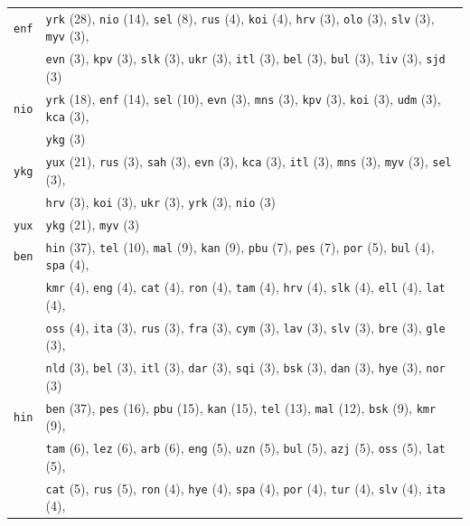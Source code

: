 \begin{center}
\begin{longtable}{ll}
\texttt{enf} & \texttt{yrk} (28), \texttt{nio} (14), \texttt{sel} (8), \texttt{rus} (4), \texttt{koi} (4), \texttt{hrv} (3), \texttt{olo} (3), \texttt{slv} (3), \texttt{myv} (3), \\
 & \texttt{evn} (3), \texttt{kpv} (3), \texttt{slk} (3), \texttt{ukr} (3), \texttt{itl} (3), \texttt{bel} (3), \texttt{bul} (3), \texttt{liv} (3), \texttt{sjd} (3) \\
\texttt{nio} & \texttt{yrk} (18), \texttt{enf} (14), \texttt{sel} (10), \texttt{evn} (3), \texttt{mns} (3), \texttt{kpv} (3), \texttt{koi} (3), \texttt{udm} (3), \texttt{kca} (3), \\
 & \texttt{ykg} (3) \\
\texttt{ykg} & \texttt{yux} (21), \texttt{rus} (3), \texttt{sah} (3), \texttt{evn} (3), \texttt{kca} (3), \texttt{itl} (3), \texttt{mns} (3), \texttt{myv} (3), \texttt{sel} (3), \\
 & \texttt{hrv} (3), \texttt{koi} (3), \texttt{ukr} (3), \texttt{yrk} (3), \texttt{nio} (3) \\
\texttt{yux} & \texttt{ykg} (21), \texttt{myv} (3) \\
\texttt{ben} & \texttt{hin} (37), \texttt{tel} (10), \texttt{mal} (9), \texttt{kan} (9), \texttt{pbu} (7), \texttt{pes} (7), \texttt{por} (5), \texttt{bul} (4), \texttt{spa} (4), \\
 & \texttt{kmr} (4), \texttt{eng} (4), \texttt{cat} (4), \texttt{ron} (4), \texttt{tam} (4), \texttt{hrv} (4), \texttt{slk} (4), \texttt{ell} (4), \texttt{lat} (4), \\
 & \texttt{oss} (4), \texttt{ita} (3), \texttt{rus} (3), \texttt{fra} (3), \texttt{cym} (3), \texttt{lav} (3), \texttt{slv} (3), \texttt{bre} (3), \texttt{gle} (3), \\
 & \texttt{nld} (3), \texttt{bel} (3), \texttt{itl} (3), \texttt{dar} (3), \texttt{sqi} (3), \texttt{bsk} (3), \texttt{dan} (3), \texttt{hye} (3), \texttt{nor} (3) \\
\texttt{hin} & \texttt{ben} (37), \texttt{pes} (16), \texttt{pbu} (15), \texttt{kan} (15), \texttt{tel} (13), \texttt{mal} (12), \texttt{bsk} (9), \texttt{kmr} (9),\\
 & \texttt{tam} (6), \texttt{lez} (6), \texttt{arb} (6), \texttt{eng} (5), \texttt{uzn} (5), \texttt{bul} (5), \texttt{azj} (5), \texttt{oss} (5), \texttt{lat} (5),\\
 & \texttt{cat} (5), \texttt{rus} (5), \texttt{ron} (4), \texttt{hye} (4), \texttt{spa} (4), \texttt{por} (4), \texttt{tur} (4), \texttt{slv} (4), \texttt{ita} (4),\\

\end{longtable}
\end{center}
